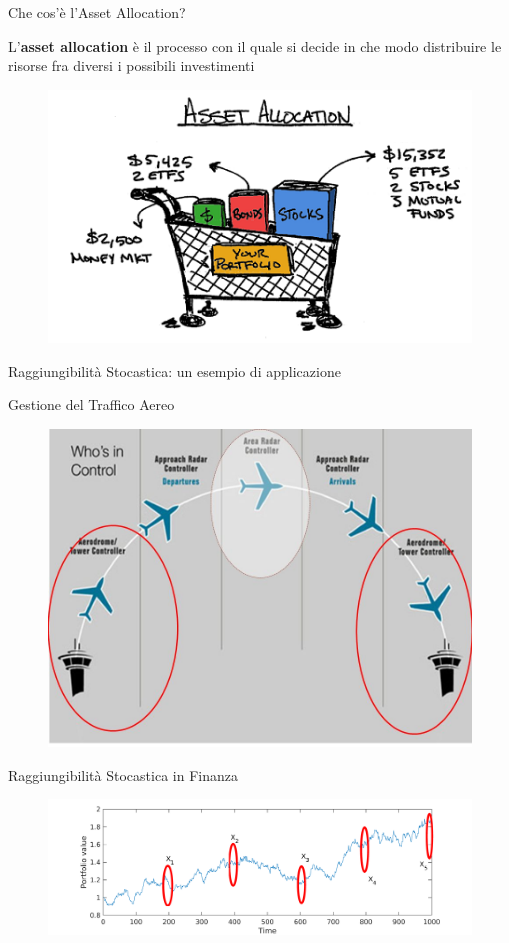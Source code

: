 \begin{frame}{Che cos'è l'Asset Allocation?}
	
    \begin{definition}
			L’\textbf{asset allocation} è il processo con il quale si decide in che modo distribuire le risorse fra diversi i possibili investimenti
    \end{definition}
	\begin{figure}
		\centering
		\includegraphics[width=.6\linewidth]{Images/AA}
	\end{figure}
\end{frame}


\begin{frame}{Raggiungibilità Stocastica: un esempio di applicazione}
	\begin{block}{Gestione del Traffico Aereo}
		\begin{figure}
			\centering
			\includegraphics[width=0.7\linewidth]{Images/ATM}
		\end{figure}
	\end{block}
\end{frame}
\begin{frame}{Raggiungibilità Stocastica in Finanza}
	
		\begin{figure}
			\centering
			\includegraphics[width=1.1\linewidth]{Images/Reachability}
		\end{figure}

\end{frame}



